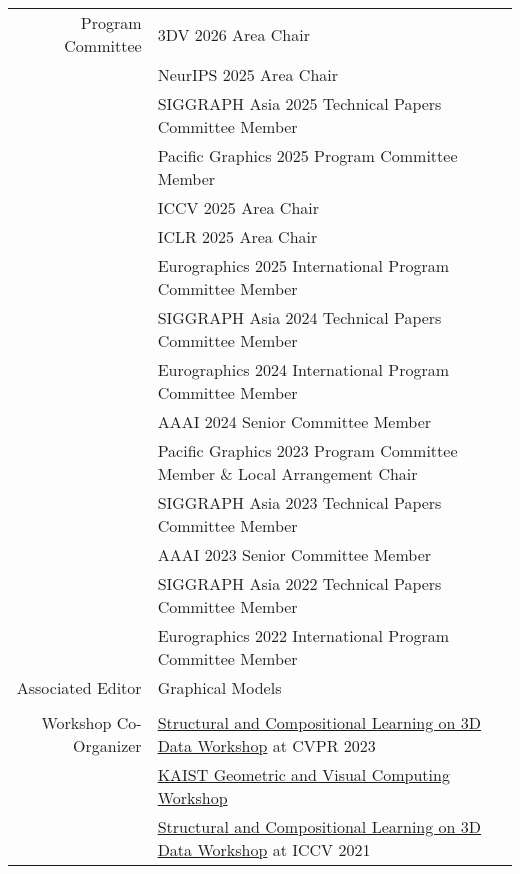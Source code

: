 \documentclass[letterpaper,10pt]{article} %
\newcommand{\blankline}{\quad\pagebreak[2]}
\begin{document}
{{\begin{tabular}{r|p{11cm}}
Program Committee
    & 3DV 2026 Area Chair\\
    & NeurIPS 2025 Area Chair\\
    & SIGGRAPH Asia 2025 Technical Papers Committee Member\\
    & Pacific Graphics 2025 Program Committee Member\\
    & ICCV 2025 Area Chair\\
    & ICLR 2025 Area Chair\\
    & Eurographics 2025 International Program Committee Member\\
    & SIGGRAPH Asia 2024 Technical Papers Committee Member\\
    & Eurographics 2024 International Program Committee Member\\
    & AAAI 2024 Senior Committee Member\\
    & Pacific Graphics 2023 Program Committee Member \& Local Arrangement Chair\\
    & SIGGRAPH Asia 2023 Technical Papers Committee Member\\
    & AAAI 2023 Senior Committee Member\\
    & SIGGRAPH Asia 2022 Technical Papers Committee Member\\
    & Eurographics 2022 International Program Committee Member\\
Associated Editor
    & Graphical Models \\
    &\\
Workshop Co-Organizer
    & \href{https://struco3d.github.io/cvpr2023/}{Structural and Compositional Learning on 3D Data Workshop} at CVPR 2023\\
    & \href{https://mhsung.github.io/gvc-workshop-2022/}{KAIST Geometric and Visual Computing Workshop}\\
    & \href{https://struco3d.github.io/iccv2021/}{Structural and Compositional Learning on 3D Data Workshop} at ICCV 2021\\
\end{tabular}\\

\blankline



}}
\end{document}
